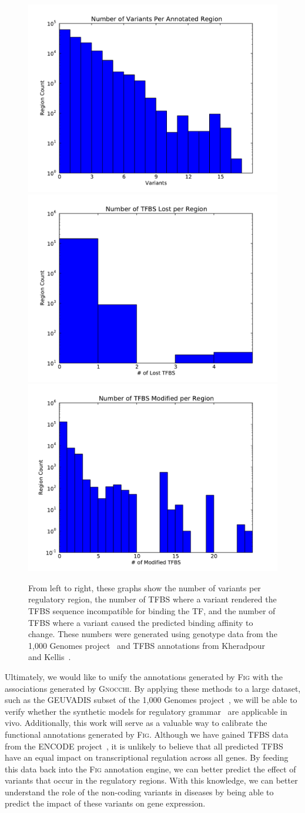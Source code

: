 \documentclass[11pt]{article} %
\begin{document}
\begin{figure}[h]
\begin{center}
\includegraphics[width=0.25\linewidth]{../fig/cmpbio290/graphs/variants.pdf}
\includegraphics[width=0.25\linewidth]{../fig/cmpbio290/graphs/lost-sites.pdf}
\includegraphics[width=0.25\linewidth]{../fig/cmpbio290/graphs/mod-sites.pdf}
\caption{From left to right, these graphs show the number of variants per regulatory region,
the number of TFBS where a variant rendered the TFBS sequence incompatible for binding the TF, and the number
of TFBS where a variant caused the predicted binding affinity to change. These numbers were
generated using genotype data from the 1,000 Genomes project~\cite{siva08} and TFBS annotations
from Kheradpour and Kellis~\cite{kheradpour14}.}
\label{fig:sites}
\end{center}
\end{figure}

Ultimately, we would like to unify the annotations generated by \textsc{Fig} with the associations
generated by \textsc{Gnocchi}. By applying these methods to a large dataset, such as the
GEUVADIS subset of the 1,000 Genomes project~\cite{lappalainen13}, we will be able to verify
whether the synthetic models for regulatory grammar~\cite{levo14, sharon12, weingarten14}
are applicable in vivo. Additionally, this work will serve as a valuable way to calibrate the
functional annotations generated by \textsc{Fig}. Although we have gained TFBS data from the
ENCODE project~\cite{gerstein12, kheradpour14}, it is unlikely to believe that all predicted
TFBS have an equal impact on transcriptional regulation across all genes. By feeding this data
back into the \textsc{Fig} annotation engine, we can better predict the effect of variants
that occur in the regulatory regions. With this knowledge, we can better understand the role
of the non-coding variants in diseases by being able to predict the impact of these variants
on gene expression.



\end{document}
